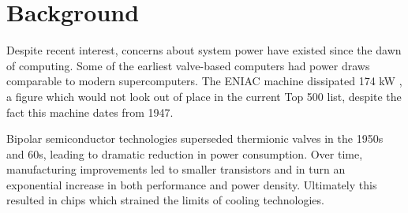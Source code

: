 \section{Background}
\label{sec:background}
Despite recent interest, concerns about system power have existed since the dawn of computing. Some of the earliest valve-based computers had power draws comparable to modern supercomputers. The ENIAC machine dissipated 174 kW \cite{birnbaum:2000aa}, a figure which would not look out of place in the current Top 500 list, despite the fact this machine dates from 1947.\golden

Bipolar semiconductor technologies superseded thermionic valves in the 1950s and 60s, leading to dramatic reduction in power consumption. Over time, manufacturing improvements led to smaller transistors and in turn an exponential increase in both performance and power density. Ultimately this resulted in chips which strained the limits of cooling technologies. \golden


